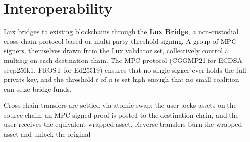 \section{Interoperability}


Lux bridges to existing blockchains through the \textbf{Lux Bridge},
a non-custodial cross-chain protocol based on multi-party threshold
signing. A group of MPC signers, themselves drawn from the Lux
validator set, collectively control a multisig on each destination
chain. The MPC protocol (CGGMP21 for ECDSA secp256k1, FROST for
Ed25519) ensures that no single signer ever holds the full
private key, and the threshold $t$ of $n$ is set high enough that
no small coalition can seize bridge funds.

Cross-chain transfers are settled via atomic swap: the user locks
assets on the source chain, an MPC-signed proof is posted to the
destination chain, and the user receives the equivalent wrapped
asset. Reverse transfers burn the wrapped asset and unlock the
original.

